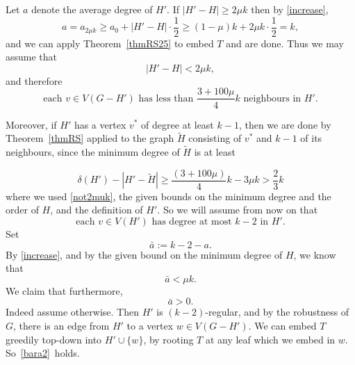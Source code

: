 \documentclass[12pt]{article}
\begin{document}
 
Let $a$ denote the average degree of $H'$. If  $ |H'-H|\ge 2\mu k$ then by \eqref{increase}, 
$$
a=a_{2\mu k} \ge a_0 + |H'-H|\cdot \frac 12 \ge (1-\mu)k +  2\mu k\cdot \frac 12 =k,
$$
and we can apply Theorem~\ref{thmRS25} to embed $T$ and are done. 
   Thus we may assume  that 
   \begin{equation}\label{not2muk}
   |H'-H|<2\mu k,
   \end{equation}
   and therefore
\begin{equation}\label{outsideH'baddeg}
   \text{each $v\in V(G-H')$ has less than $\frac{3+100\mu}{4}k$ neighbours in $H'$.}
   \end{equation}
   
   Moreover, if $H'$ has a vertex $v^*$ of degree at least $k-1$, then we are done by Theorem~\ref{thmRS} applied to the graph $\tilde H$ consisting of $v^*$ and $k-1$ of its neighbours, since the minimum degree of $\tilde H$ is at least 
   
   $$
  \delta(H')-|H'-\tilde H| \ge 
  \frac{(3+100\mu)}{4}k
  - 3\mu k >\frac 23 k
   $$
   where we used \eqref{not2muk}, the given bounds on the minimum degree and the order of $H$, and the definition of $H'$. So we  will assume from now on that
   \begin{equation}\label{mindegH'casenonbip}
   \text{each $v\in V(H')$ has degree at most $k-2$ in $H'$.}
   \end{equation}
  Set $$\bar a:=k-2-a.$$ By \eqref{increase}, and by the given bound on the minimum degree of $H$, we know that
    \begin{equation}\label{bara}
  \bar a <\mu k.
   \end{equation}
   We claim that furthermore, 
     \begin{equation}\label{bara2}
  \bar a >0.
   \end{equation}
   Indeed assume otherwise. Then $H'$ is $(k-2)$-regular, and by the robustness of $G$, there is an edge from $H'$ to a vertex $w\in V(G-H')$. We can embed $T$ greedily top-down into $H'\cup\{w\}$, by rooting $T$ at any leaf which we embed in $w$. So~\eqref{bara2}~holds.
\end{document}
